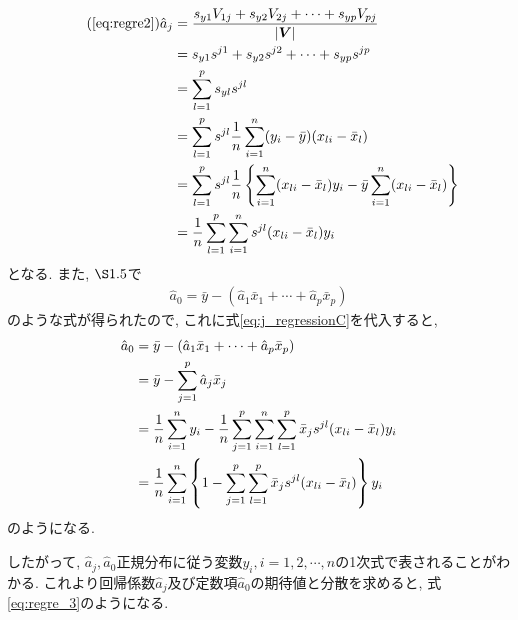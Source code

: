 \begin{align}
  \tag{\ref{eq:regre2}}
  \hat{a}_{j} %
  &= \frac{s_{y1}V_{1j}+s_{y2}V_{2j}+\cdots +s_{yp}V_{pj}}{|\bm{V}|} \\
  \notag 
  &= s_{y1}s^{j1}+s_{y2}s^{j2}+\cdots +s_{yp}s^{jp} \\
  \notag 
  &= \sum_{l=1}^ps_{yl}s^{jl} \\
  \notag 
  &= \sum_{l=1}^ps^{jl}\frac{1}{n}\sum_{i=1}^n(y_i-\bar{y})(x_{li}-\bar{x}_l) \\
  \notag 
  &= \sum_{l=1}^ps^{jl}\frac{1}{n}\left\{
      \sum_{i=1}^n(x_{li}-\bar{x}_l)y_i
      - \bar{y}\sum_{i=1}^n(x_{li}-\bar{x}_l)
    \right\} \\
  \label{eq:j_regressionC}
   &= \frac{1}{n}\sum_{l=1}^p\sum_{i=1}^ns^{jl}(x_{li}-\bar{x}_l)y_i
\end{align}
となる. また, $\S1.5$で
\begin{align}
  \label{eq:sec5_y_bar} %
  \hat{a}_0 = \bar{y}-(\hat{a}_1\bar{x}_1+\cdots+\hat{a}_p\bar{x}_p)
\end{align}
のような式が得られたので, これに式\eqref{eq:j_regressionC}を代入すると, 
\begin{align}
  \notag \hat{a}_0 %
  &= \bar{y}-(\hat{a}_1\bar{x}_1+\cdots+\hat{a}_p\bar{x}_p) \\
  \notag 
  &= \bar{y}-\sum_{j=1}^p\hat{a}_j\bar{x}_j \\
  \notag 
  &= \frac{1}{n}\sum_{i=1}^ny_i-\frac{1}{n}\sum_{j=1}^p\sum_{i=1}^n\sum_{l=1}^p\bar{x}_js^{jl}(x_{li}-\bar{x}_l)y_i \\
  \label{eq:0_regressionC}
  &=\frac{1}{n}\sum_{i=1}^n\left\{
      1-\sum_{j=1}^p\sum_{l=1}^p\bar{x}_js^{jl}(x_{li}-\bar{x}_l)
    \right\}y_i
\end{align}
のようになる. 

したがって, $\hat{a}_j, \hat{a}_0$正規分布に従う変数$y_i, i=1, 2, \cdots, n$の1次式で表されることがわかる. これより回帰係数$\hat{a}_j$及び定数項$\hat{a}_0$の期待値と分散を求めると, 式\eqref{eq:regre_3}のようになる. 


